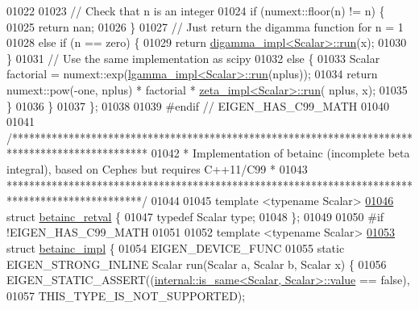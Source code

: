 \begin{DoxyCode}
01022 
01023         \textcolor{comment}{// Check that n is an integer}
01024         \textcolor{keywordflow}{if} (numext::floor(n) != n) \{
01025             \textcolor{keywordflow}{return} nan;
01026         \}
01027         \textcolor{comment}{// Just return the digamma function for n = 1}
01028         \textcolor{keywordflow}{else} \textcolor{keywordflow}{if} (n == zero) \{
01029             \textcolor{keywordflow}{return} \hyperlink{struct_eigen_1_1internal_1_1digamma__impl}{digamma\_impl<Scalar>::run}(x);
01030         \}
01031         \textcolor{comment}{// Use the same implementation as scipy}
01032         \textcolor{keywordflow}{else} \{
01033             Scalar factorial = numext::exp(\hyperlink{struct_eigen_1_1internal_1_1lgamma__impl}{lgamma\_impl<Scalar>::run}(nplus));
01034             \textcolor{keywordflow}{return} numext::pow(-one, nplus) * factorial * \hyperlink{struct_eigen_1_1internal_1_1zeta__impl}{zeta\_impl<Scalar>::run}(
      nplus, x);
01035         \}
01036   \}
01037 \};
01038 
01039 \textcolor{preprocessor}{#endif  // EIGEN\_HAS\_C99\_MATH}
01040 
01041 \textcolor{comment}{/************************************************************************************************}
01042 \textcolor{comment}{ * Implementation of betainc (incomplete beta integral), based on Cephes but requires C++11/C99 *}
01043 \textcolor{comment}{ ************************************************************************************************/}
01044 
01045 \textcolor{keyword}{template} <\textcolor{keyword}{typename} Scalar>
\hyperlink{struct_eigen_1_1internal_1_1betainc__retval}{01046} \textcolor{keyword}{struct }\hyperlink{struct_eigen_1_1internal_1_1betainc__retval}{betainc\_retval} \{
01047   \textcolor{keyword}{typedef} Scalar type;
01048 \};
01049 
01050 \textcolor{preprocessor}{#if !EIGEN\_HAS\_C99\_MATH}
01051 
01052 \textcolor{keyword}{template} <\textcolor{keyword}{typename} Scalar>
\hyperlink{struct_eigen_1_1internal_1_1betainc__impl}{01053} \textcolor{keyword}{struct }\hyperlink{struct_eigen_1_1internal_1_1betainc__impl}{betainc\_impl} \{
01054   EIGEN\_DEVICE\_FUNC
01055   \textcolor{keyword}{static} EIGEN\_STRONG\_INLINE Scalar run(Scalar a, Scalar b, Scalar x) \{
01056     EIGEN\_STATIC\_ASSERT((\hyperlink{struct_eigen_1_1internal_1_1is__same}{internal::is\_same<Scalar, Scalar>::value} 
      == \textcolor{keyword}{false}),
01057                         THIS\_TYPE\_IS\_NOT\_SUPPORTED);

\end{DoxyCode}
